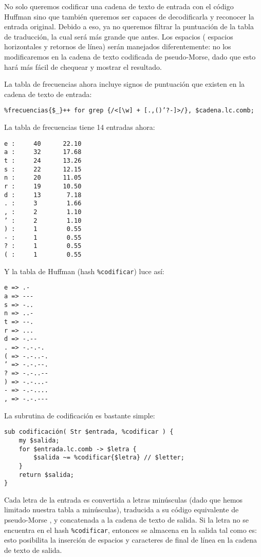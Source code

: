 No solo queremos codificar una cadena de texto de entrada con el código Huffman
sino que también queremos ser capaces de decodificarla y reconocer la
entrada original. Debido a eso, ya no queremos filtrar la puntuación de la
tabla de traducción, la cual será más grande que antes. Los espacios (
espacios horizontales y retornos de línea) serán manejados diferentemente:
no los modificaremos en la cadena de texto codificada de pseudo-Morse,
dado que esto hará más fácil de chequear y mostrar el resultado. 
 
La tabla de frecuencias ahora incluye signos de puntuación que existen
en la cadena de texto de entrada:

\begin{verbatim}
%frecuencias{$_}++ for grep {/<[\w] + [.,()’?-]>/}, $cadena.lc.comb;
\end{verbatim}

La tabla de frecuencias tiene 14 entradas ahora:

\begin{verbatim}
e :     40      22.10
a :     32      17.68
t :     24      13.26
s :     22      12.15
n :     20      11.05
r :     19      10.50
d :     13       7.18
. :     3        1.66
, :     2        1.10
’ :     2        1.10
) :     1        0.55
- :     1        0.55
? :     1        0.55
( :     1        0.55
\end{verbatim}

Y la tabla de Huffman (hash \verb|%codificar|) luce así:

\begin{verbatim}
e => .-
a => ---
s => -..
n => ..-
t => --.
r => ...
d => -.--
. => -.-.-.
( => -.-..-.
’ => -.-.--.
? => -.-..--
) => -.-...-
- => -.-....
, => -.-.---
\end{verbatim}

La subrutina de codificación es bastante simple:

\begin{verbatim}
sub codificación( Str $entrada, %codificar ) {
    my $salida;
    for $entrada.lc.comb -> $letra {
        $salida ~= %codificar{$letra} // $letter;
    }
    return $salida;
}
\end{verbatim}

Cada letra de la entrada es convertida a letras minúsculas (dado
que hemos limitado nuestra tabla a minúsculas), traducida a su 
código equivalente de pseudo-Morse , y concatenada a la cadena de 
texto de salida. Si la letra no se encuentra en el hash \verb|%codificar|,
entonces se almacena en la salida tal como es: esto posibilita la
inserción de espacios y caracteres de final de línea en la cadena
de texto de salida.

